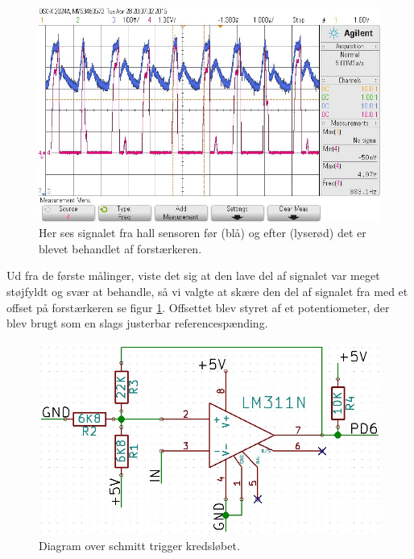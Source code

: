 \begin{figure}[h]

	\centering
		\includegraphics[scale=0.4]{Billeder/Signal1.jpg}
	\caption{Her ses signalet fra hall sensoren før (blå) og efter (lyserød) det er blevet behandlet af forstærkeren.}
	\label{fig:Signal1}
	
\end{figure}

Ud fra de første målinger, viste det sig at den lave del af signalet var meget støjfyldt og svær at behandle, så vi valgte at skære den del af signalet fra med et offset på forstærkeren se figur \ref{fig:Signal1}. Offsettet blev styret af et potentiometer, der blev brugt som en slags justerbar referencespænding.

\begin{figure}[h]

	\centering
		\includegraphics[scale=0.3]{Billeder/Schmitt.jpg}
	\caption{Diagram over schmitt trigger kredsløbet.}
	\label{fig:Schmitt}
	
\end{figure}

